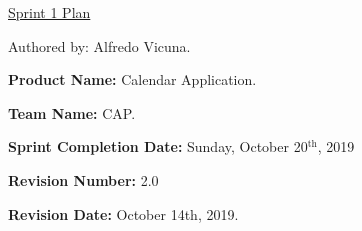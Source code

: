 \documentclass[2pt]{article}
\begin{document}
    \begin{center}
        \underline{Sprint 1 Plan}
        \item Authored by: Alfredo Vicuna.
    \end{center}

    \begin{flushleft}
        \item \textbf{Product Name: }Calendar Application.
        \item \textbf{Team Name: } CAP.
        \item \textbf{Sprint Completion Date: } Sunday, October 20$^{\text{th}}$, 2019
        \item \textbf{Revision Number: } 2.0
        \item \textbf{Revision Date: } October 14th, 2019.
        

\end{flushleft}
\end{document}
